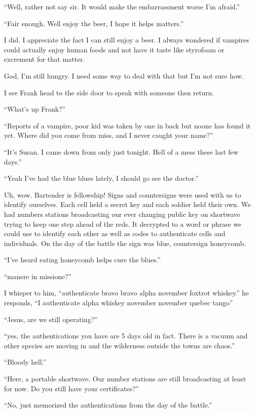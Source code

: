 ``Well, rather not say sir. It would make the embarrassment worse I'm afraid.''

``Fair enough. Well enjoy the beer, I hope it helps matters.''

I did. I appreciate the fact I can still enjoy a beer. I always wondered if vampires could actually enjoy human foods and not have it taste like styrofoam or excrement for that matter.

God, I'm still hungry. I need some way to deal with that but I'm not sure how.

I see Frank head to the side door to speak with someone then return.

``What's up Frank?''

``Reports of a vampire, poor kid was taken by one in back but noone has found it yet. Where did you come from miss, and I never caught your name?''

``It's Susan. I came down from \chichenitza only just tonight. Hell of a mess these last few days.''

``Yeah I've had the blue blues lately, I should go see the doctor.''

Uh, wow. Bartender is fellowship! Signs and countersigns were used with us to identify ourselves. Each cell held a secret key and each soldier held their own. We had numbers stations broadcasting our ever changing public key on shortwave trying to keep one step ahead of the reds. It decrypted to a word or phrase we could use to identify each other as well as codes to authenticate cells and individuals. On the day of the battle the sign was blue, countersign honeycomb.

``I've heard eating honeycomb helps cure the blues.''

``manere in missione?''

I whisper to him, ``authenticate bravo bravo alpha november foxtrot whiskey.''
he responds, ``I authenticate alpha whiskey november november quebec tango''

``Jesus, are we still operating?''

``yes, the authentications you have are 5 days old in fact. There is a vacuum and other species are moving in and the wilderness outside the towns are chaos.''

``Bloody hell.''

``Here, a portable shortwave. Our number stations are still broadcasting at least for now. Do you still have your certificates?''

``No, just memorized the authentications from the day of the battle.''

